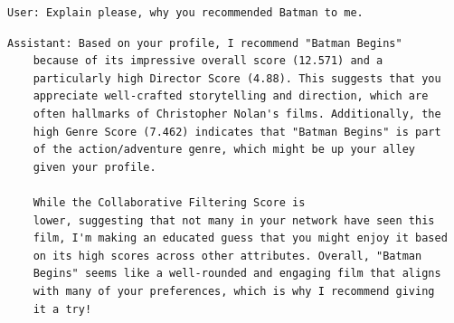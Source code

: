 



\begin{lstlisting}[basicstyle=\ttfamily, frame=single]
    User: Explain please, why you recommended Batman to me.
    \end{lstlisting}
    
    \begin{lstlisting}[basicstyle=\ttfamily, frame=single]
    Assistant: Based on your profile, I recommend "Batman Begins"
    because of its impressive overall score (12.571) and a
    particularly high Director Score (4.88). This suggests that you
    appreciate well-crafted storytelling and direction, which are
    often hallmarks of Christopher Nolan's films. Additionally, the
    high Genre Score (7.462) indicates that "Batman Begins" is part
    of the action/adventure genre, which might be up your alley
    given your profile. 
    
    While the Collaborative Filtering Score is
    lower, suggesting that not many in your network have seen this
    film, I'm making an educated guess that you might enjoy it based
    on its high scores across other attributes. Overall, "Batman
    Begins" seems like a well-rounded and engaging film that aligns
    with many of your preferences, which is why I recommend giving
    it a try!
    \end{lstlisting}